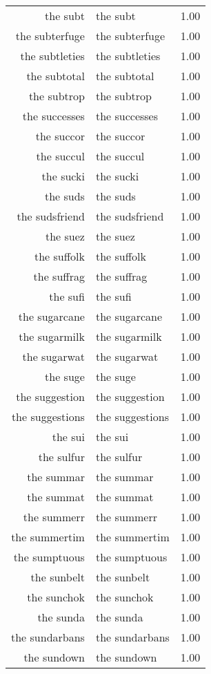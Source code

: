 \begin{table}[ht]
\begin{tabular}{rlr}
  the subt & the subt & 1.00 \\ 
  the subterfuge & the subterfuge & 1.00 \\ 
  the subtleties & the subtleties & 1.00 \\ 
  the subtotal & the subtotal & 1.00 \\ 
  the subtrop & the subtrop & 1.00 \\ 
  the successes & the successes & 1.00 \\ 
  the succor & the succor & 1.00 \\ 
  the succul & the succul & 1.00 \\ 
  the sucki & the sucki & 1.00 \\ 
  the suds & the suds & 1.00 \\ 
  the sudsfriend & the sudsfriend & 1.00 \\ 
  the suez & the suez & 1.00 \\ 
  the suffolk & the suffolk & 1.00 \\ 
  the suffrag & the suffrag & 1.00 \\ 
  the sufi & the sufi & 1.00 \\ 
  the sugarcane & the sugarcane & 1.00 \\ 
  the sugarmilk & the sugarmilk & 1.00 \\ 
  the sugarwat & the sugarwat & 1.00 \\ 
  the suge & the suge & 1.00 \\ 
  the suggestion & the suggestion & 1.00 \\ 
  the suggestions & the suggestions & 1.00 \\ 
  the sui & the sui & 1.00 \\ 
  the sulfur & the sulfur & 1.00 \\ 
  the summar & the summar & 1.00 \\ 
  the summat & the summat & 1.00 \\ 
  the summerr & the summerr & 1.00 \\ 
  the summertim & the summertim & 1.00 \\ 
  the sumptuous & the sumptuous & 1.00 \\ 
  the sunbelt & the sunbelt & 1.00 \\ 
  the sunchok & the sunchok & 1.00 \\ 
  the sunda & the sunda & 1.00 \\ 
  the sundarbans & the sundarbans & 1.00 \\ 
  the sundown & the sundown & 1.00 \\ 

\end{tabular}
\end{table}
